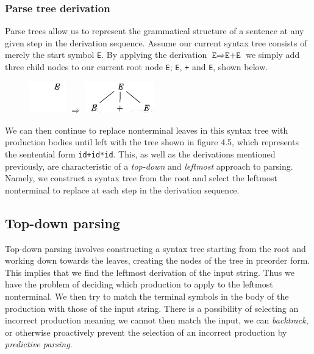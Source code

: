 \documentclass[a4paper, 11pt]{article}
\begin{document}
\subsubsection{Parse tree derivation}
Parse trees allow us to represent the grammatical structure of a sentence at any given step in the derivation sequence. Assume our current syntax tree consists of merely the start symbol \texttt{E}. By applying the derivation $\texttt{E} \Rightarrow \texttt{E+E}$ we simply add three child nodes to our current root node \texttt{E}; \texttt{E}, \texttt{+} and \texttt{E}, shown below.

\begin{figure}[ht!]
	\centering
	\includegraphics[align=c,width=16mm]{resource/SyntaxTree2.png}
	$\Rightarrow$
	\includegraphics[align=c,width=30mm]{resource/SyntaxTree3.png}
\end{figure}

\noindent We can then continue to replace nonterminal leaves in this syntax tree with production bodies until left with the tree shown in figure 4.5, which represents the sentential form \texttt{id+id*id}. This, as well as the derivations mentioned previously, are characteristic of a \textit{top-down} and \textit{leftmost} approach to parsing. Namely, we construct a syntax tree from the root and select the leftmost nonterminal to replace at each step in the derivation sequence.

\subsection{Top-down parsing}
Top-down parsing involves constructing a syntax tree starting from the root and working down towards the leaves, creating the nodes of the tree in preorder form. This implies that we find the leftmost derivation of the input string. Thus we have the problem of deciding which production to apply to the leftmost nonterminal. We then try to match the terminal symbols in the body of the production with those of the input string. There is a possibility of selecting an incorrect production meaning we cannot then match the input, we can \textit{backtrack}, or otherwise proactively prevent the selection of an incorrect production by \textit{predictive parsing}.
\end{document}
